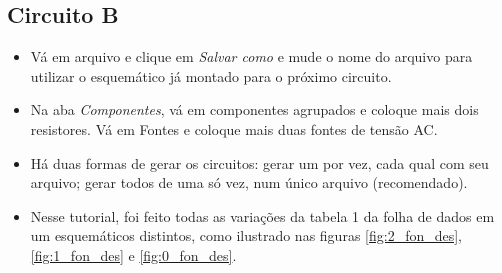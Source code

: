\subsection{Circuito B}
    \begin{itemize}
        \item Vá em arquivo e clique em \textit{Salvar como} e mude o nome do arquivo para utilizar o esquemático já montado para o próximo circuito.
        \item Na aba \textit{Componentes}, vá em componentes agrupados e coloque mais dois resistores. Vá em Fontes e coloque mais duas fontes de tensão AC.
        \item Há duas formas de gerar os circuitos: gerar um por vez, cada qual com seu arquivo; gerar todos de uma só vez, num único arquivo (recomendado).
        \item Nesse tutorial, foi feito todas as variações da tabela 1 da folha de dados em um esquemáticos distintos, como ilustrado nas figuras \ref{fig:2_fon_des}, \ref{fig:1_fon_des} e \ref{fig:0_fon_des}.
    \end{itemize}

